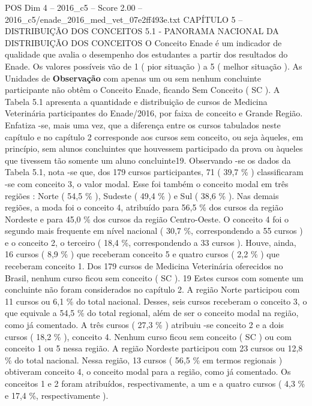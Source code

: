 \begin{textsample}{POS Dim 4 – 2016\_c5 – Score 2.00 – 2016\_c5/enade\_2016\_med\_vet\_07e2ff493e.txt}  \label{ex:f4_pos_105}
CAPÍTULO 5 – DISTRIBUIÇÃO DOS CONCEITOS 5.1 - PANORAMA NACIONAL DA DISTRIBUIÇÃO DOS CONCEITOS O Conceito Enade é um indicador de qualidade que avalia o desempenho dos estudantes a partir dos resultados do Enade.
Os valores possíveis vão de 1 ( pior situação ) a 5 ( melhor situação ).
As Unidades de \textbf{Observação} com apenas um ou sem nenhum concluinte participante não obtêm o Conceito Enade, ficando Sem Conceito ( SC ).
A Tabela 5.1 apresenta a quantidade e distribuição de cursos de Medicina Veterinária participantes do Enade/2016, por faixa de conceito e Grande Região.
Enfatiza -se, mais uma vez, que a diferença entre os cursos tabulados neste capítulo e no capítulo 2 corresponde aos cursos sem conceito, ou seja àqueles, em princípio, sem alunos concluintes que houvessem participado da prova ou àqueles que tivessem tão somente um aluno concluinte19.
Observando -se os dados da Tabela 5.1, nota -se que, dos 179 cursos participantes, 71 ( 39,7 \% ) classificaram -se com conceito 3, o valor modal.
Esse foi também o conceito modal em três regiões : Norte ( 54,5 \% ), Sudeste ( 49,4 \% ) e Sul ( 38,6 \% ).
Nas demais regiões, a moda foi o conceito 4, atribuído para 56,5 \% dos cursos da região Nordeste e para 45,0 \% dos cursos da região Centro-Oeste.
O conceito 4 foi o segundo mais frequente em nível nacional ( 30,7 \%, correspondendo a 55 cursos ) e o conceito 2, o terceiro ( 18,4 \%, correspondendo a 33 cursos ).
Houve, ainda, 16 cursos ( 8,9 \% ) que receberam conceito 5 e quatro cursos ( 2,2 \% ) que receberam conceito 1.
Dos 179 cursos de Medicina Veterinária oferecidos no Brasil, nenhum curso ficou sem conceito ( SC ). 19 Estes cursos com somente um concluinte não foram considerados no capítulo 2.
A região Norte participou com 11 cursos ou 6,1 \% do total nacional.
Desses, seis cursos receberam o conceito 3, o que equivale a 54,5 \% do total regional, além de ser o conceito modal na região, como já comentado.
A três cursos ( 27,3 \% ) atribuiu -se conceito 2 e a dois cursos ( 18,2 \% ), conceito 4.
Nenhum curso ficou sem conceito ( SC ) ou com conceito 1 ou 5 nessa região.
A região Nordeste participou com 23 cursos ou 12,8 \% do total nacional.
Nessa região, 13 cursos ( 56,5 \% em termos regionais ) obtiveram conceito 4, o conceito modal para a região, como já comentado.
Os conceitos 1 e 2 foram atribuídos, respectivamente, a um e a quatro cursos ( 4,3 \% e 17,4 \%, respectivamente ).

\end{textsample}
